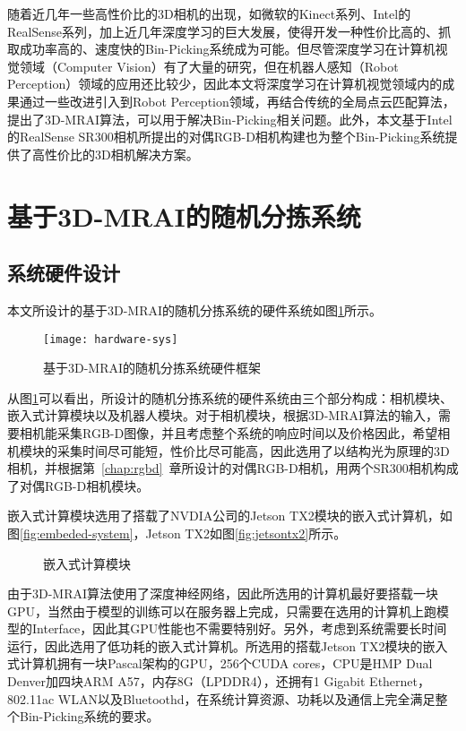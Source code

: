 随着近几年一些高性价比的3D相机的出现，如微软的Kinect系列、Intel的RealSense系列，加上近几年深度学习的巨大发展，使得开发一种性价比高的、抓取成功率高的、速度快的Bin-Picking系统成为可能。但尽管深度学习在计算机视觉领域（Computer Vision）有了大量的研究，但在机器人感知（Robot Perception）领域的应用还比较少，因此本文将深度学习在计算机视觉领域内的成果通过一些改进引入到Robot Perception领域，再结合传统的全局点云匹配算法，提出了3D-MRAI算法，可以用于解决Bin-Picking相关问题。此外，本文基于Intel的RealSense SR300相机所提出的对偶RGB-D相机构建也为整个Bin-Picking系统提供了高性价比的3D相机解决方案。

\section{基于3D-MRAI的随机分拣系统}
\subsection{系统硬件设计}
本文所设计的基于3D-MRAI的随机分拣系统的硬件系统如图\ref{fig:hardware-sys}所示。
\begin{figure}[ht]
  \centering
  \texttt{[image: hardware-sys]}
  \caption{基于3D-MRAI的随机分拣系统硬件框架}
  \label{fig:hardware-sys}
\end{figure}
从图\ref{fig:hardware-sys}可以看出，所设计的随机分拣系统的硬件系统由三个部分构成：相机模块、嵌入式计算模块以及机器人模块。对于相机模块，根据3D-MRAI算法的输入，需要相机能采集RGB-D图像，并且考虑整个系统的响应时间以及价格因此，希望相机模块的采集时间尽可能短，性价比尽可能高，因此选用了以结构光为原理的3D相机，并根据第~\ref{chap:rgbd}~章所设计的对偶RGB-D相机，用两个SR300相机构成了对偶RGB-D相机模块。

嵌入式计算模块选用了搭载了NVDIA公司的Jetson TX2模块的嵌入式计算机，如图\ref{fig:embeded-system}，Jetson TX2如图\ref{fig:jetsontx2}所示。
\begin{figure}[ht]
  \centering
  \vfill
  \caption{嵌入式计算模块}
\end{figure}
由于3D-MRAI算法使用了深度神经网络，因此所选用的计算机最好要搭载一块GPU，当然由于模型的训练可以在服务器上完成，只需要在选用的计算机上跑模型的Interface，因此其GPU性能也不需要特别好。另外，考虑到系统需要长时间运行，因此选用了低功耗的嵌入式计算机。所选用的搭载Jetson TX2模块的嵌入式计算机拥有一块Pascal架构的GPU，256个CUDA cores，CPU是HMP Dual Denver加四块ARM A57，内存8G（LPDDR4），还拥有1 Gigabit Ethernet，802.11ac WLAN以及Bluetoothd，在系统计算资源、功耗以及通信上完全满足整个Bin-Picking系统的要求。

